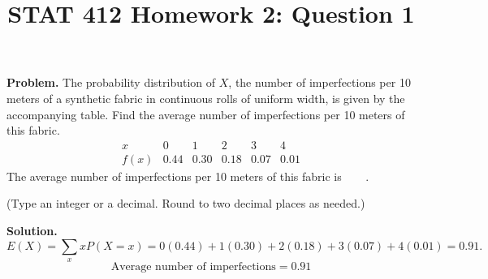 \documentclass[11pt]{article}
\title{STAT 412 Homework 2: Question 1}
\author{}
\date{}
\begin{document}
\maketitle
\textbf{Problem.} The probability distribution of \(X\), the number of
imperfections per 10 meters of a synthetic fabric in continuous rolls of
uniform width, is given by the accompanying table. Find the average number of
imperfections per 10 meters of this fabric.
\[
\begin{array}{c|ccccc}x&0&1&2&3&4\\\hline
f(x)&0.44&0.30&0.18&0.07&0.01\end{array}
\]
The average number of imperfections per 10 meters of this fabric is
\(\boxed{\phantom{0.00}}\).

(Type an integer or a decimal. Round to two decimal places as needed.)

\textbf{Solution.}
\[
E(X)=\sum_x xP(X=x)
=0(0.44)+1(0.30)+2(0.18)+3(0.07)+4(0.01)=0.91.
\]
\[
\boxed{\text{Average number of imperfections}=0.91}
\]
\end{document}

